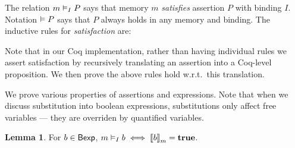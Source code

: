 \documentclass[10pt]{article}
\theoremstyle{definition}
\newtheorem{lemma}{Lemma}
\begin{document}
The relation $\AVAL m|I|-P$
says that memory $m$ \emph{satisfies} assertion $P$
with binding $I$.
Notation $\vDash P$ says that $P$ always holds
in any memory and binding.
The inductive rules for \emph{satisfaction} are:
%

Note that in our Coq implementation,
rather than having individual rules
we assert satisfaction
by recursively translating an assertion
into a Coq-level proposition.
%
We then prove the above rules hold
w.r.t.\ this translation.

We prove various properties of assertions and expressions.
Note that when we discuss substitution into boolean expressions,
substitutions only affect free variables ---
they are overriden by quantified variables.

\begin{lemma}
For $b \in \mathsf{Bexp}$,
$\AVALmi b \iff \Eval(b,m) = \True$.
\end{lemma}
\end{document}
